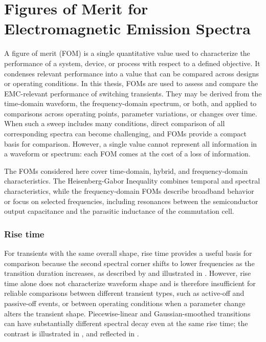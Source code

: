 
\section{Figures of Merit for Electromagnetic Emission Spectra}
A figure of merit (FOM) is a single quantitative value used to characterize the performance of a system, device, or process with respect to a defined objective. 
It condenses relevant performance into a value that can be compared across designs or operating conditions. 
In this thesis, FOMs are used to assess and compare the EMC-relevant performance of switching transients. 
They may be derived from the time-domain waveform, the frequency-domain spectrum, or both, and applied to comparisons across operating points, parameter variations, or changes over time. 
When such a sweep includes many conditions, direct comparison of all corresponding spectra can become challenging, and FOMs provide a compact basis for comparison. 
However, a single value cannot represent all information in a waveform or spectrum: each FOM comes at the cost of a loss of information.

The FOMs considered here cover time-domain, hybrid, and frequency-domain characteristics. 
The Heisenberg-Gabor Inequality combines temporal and spectral characteristics, while the frequency-domain FOMs describe broadband behavior or focus on selected frequencies, including resonances between the semiconductor output capacitance and the parasitic inductance of the commutation cell.

\subsubsection*{Rise time {\boldmath{}}}
For transients with the same overall shape, rise time provides a useful basis for comparison because the second spectral corner shifts to lower frequencies as the transition duration increases, as described by  and illustrated in . 
However, rise time alone does not characterize waveform shape and is therefore insufficient for reliable comparisons between different transient types, such as active-off and passive-off events, or between operating conditions when a parameter change alters the transient shape. 
Piecewise-linear and Gaussian-smoothed transitions can have substantially different spectral decay even at the same rise time; the contrast is illustrated in , and reflected in .



